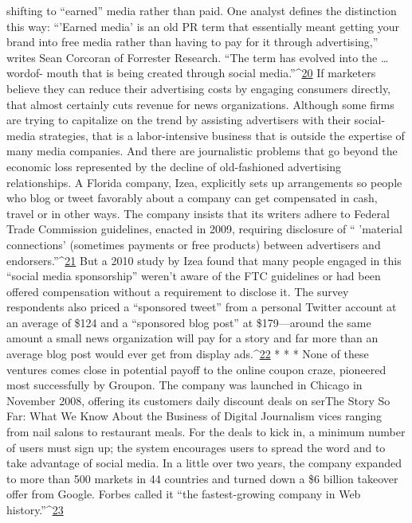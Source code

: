 shifting to ``earned'' media rather than paid. One analyst defines the distinction
this way: ``'Earned media' is an old PR term that essentially meant getting your
brand into free media rather than having to pay for it through advertising,'' writes
Sean Corcoran of Forrester Research. ``The term has evolved into the … wordof-
mouth that is being created through social media.''^{\href{#endnotes-chapter-8}{20}}
If marketers believe they can reduce their advertising costs by engaging consumers
directly, that almost certainly cuts revenue for news organizations. Although
some firms are trying to capitalize on the trend by assisting advertisers
with their social-media strategies, that is a labor-intensive business that is outside
the expertise of many media companies.
And there are journalistic problems that go beyond the economic loss represented
by the decline of old-fashioned advertising relationships. A Florida company,
Izea, explicitly sets up arrangements so people who blog or tweet favorably
about a company can get compensated in cash, travel or in other ways. The
company insists that its writers adhere to Federal Trade Commission guidelines,
enacted in 2009, requiring disclosure of `` 'material connections' (sometimes payments
or free products) between advertisers and endorsers.''^{\href{#endnotes-chapter-8}{21}}
But a 2010 study by Izea found that many people engaged in this ``social media
sponsorship'' weren't aware of the FTC guidelines or had been offered compensation
without a requirement to disclose it. The survey respondents also priced a
``sponsored tweet'' from a personal Twitter account at an average of \$124 and a
``sponsored blog post'' at \$179—around the same amount a small news organization
will pay for a story and far more than an average blog post would ever get
from display ads.^{\href{#endnotes-chapter-8}{22}}
* * *
None of these ventures comes close in potential payoff to the online coupon
craze, pioneered most successfully by Groupon. The company was launched in
Chicago in November 2008, offering its customers daily discount deals on serThe
Story So Far: What We Know About the Business of Digital Journalism
vices ranging from nail salons to restaurant meals. For the deals to kick in, a
minimum number of users must sign up; the system encourages users to spread
the word and to take advantage of social media.
In a little over two years, the company expanded to more than 500 markets in
44 countries and turned down a \$6 billion takeover offer from Google. Forbes
called it ``the fastest-growing company in Web history.''^{\href{#endnotes-chapter-8}{23}}
